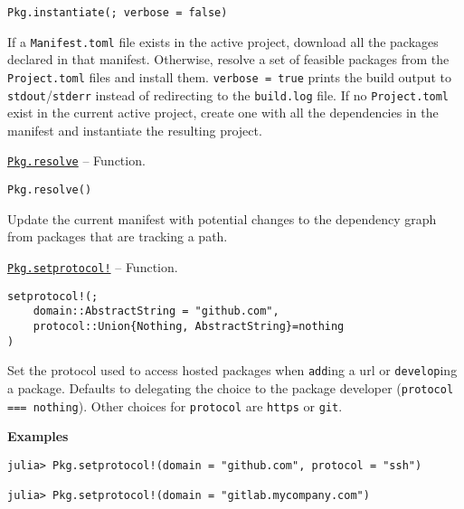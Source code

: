 \begin{adjustwidth}{2em}{0pt}


\begin{verbatim}
Pkg.instantiate(; verbose = false)
\end{verbatim}

If a \texttt{Manifest.toml} file exists in the active project, download all the packages declared in that manifest. Otherwise, resolve a set of feasible packages from the \texttt{Project.toml} files and install them. \texttt{verbose = true} prints the build output to \texttt{stdout}/\texttt{stderr} instead of redirecting to the \texttt{build.log} file. If no \texttt{Project.toml} exist in the current active project, create one with all the dependencies in the manifest and instantiate the resulting project.



\end{adjustwidth}
\hypertarget{13977221485522627510}{} 
\hyperlink{13977221485522627510}{\texttt{Pkg.resolve}}  -- {Function.}

\begin{adjustwidth}{2em}{0pt}


\begin{verbatim}
Pkg.resolve()
\end{verbatim}

Update the current manifest with potential changes to the dependency graph from packages that are tracking a path.



\end{adjustwidth}
\hypertarget{1574626393961447104}{} 
\hyperlink{1574626393961447104}{\texttt{Pkg.setprotocol!}}  -- {Function.}

\begin{adjustwidth}{2em}{0pt}


\begin{verbatim}
setprotocol!(;
    domain::AbstractString = "github.com",
    protocol::Union{Nothing, AbstractString}=nothing
)
\end{verbatim}

Set the protocol used to access hosted packages when \texttt{add}ing a url or \texttt{develop}ing a package. Defaults to delegating the choice to the package developer (\texttt{protocol === nothing}). Other choices for \texttt{protocol} are \texttt{{\textquotedbl}https{\textquotedbl}} or \texttt{{\textquotedbl}git{\textquotedbl}}.

\textbf{Examples}


\begin{verbatim}
julia> Pkg.setprotocol!(domain = "github.com", protocol = "ssh")

julia> Pkg.setprotocol!(domain = "gitlab.mycompany.com")
\end{verbatim}



\end{adjustwidth}

